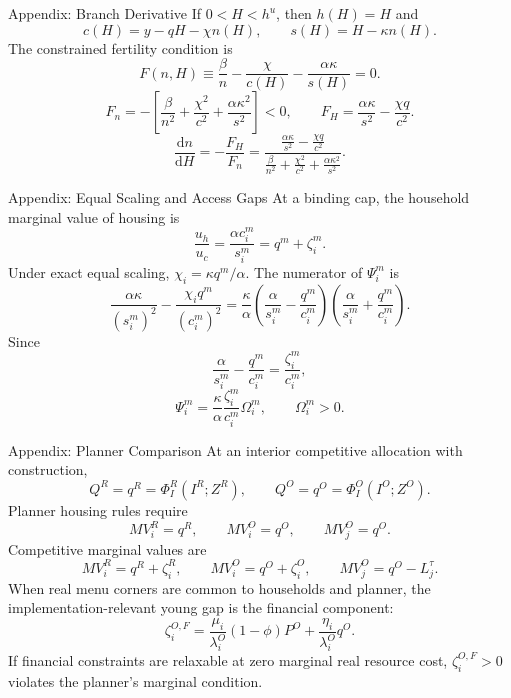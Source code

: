 \documentclass[11pt,aspectratio=169]{beamer}
\newcommand{\dd}{\mathrm d}
\newcommand{\1}{\mathbf 1}
\begin{document}
\appendix

\begin{frame}{Appendix: Branch Derivative}
\small
If \(0<H<h^u\), then \(h(H)=H\) and
\[
c(H)=y-qH-\chi n(H),
\qquad
s(H)=H-\kappa n(H).
\]
The constrained fertility condition is
\[
F(n,H)\equiv
\frac{\beta}{n}
-
\frac{\chi}{c(H)}
-
\frac{\alpha\kappa}{s(H)}
=0.
\]
\[
F_n
=
-
\left[
\frac{\beta}{n^2}
+
\frac{\chi^2}{c^2}
+
\frac{\alpha\kappa^2}{s^2}
\right]<0,
\qquad
F_H
=
\frac{\alpha\kappa}{s^2}
-
\frac{\chi q}{c^2}.
\]
\[
\frac{\dd n}{\dd H}
=
-\frac{F_H}{F_n}
=
\frac{
\frac{\alpha\kappa}{s^2}
-
\frac{\chi q}{c^2}
}{
\frac{\beta}{n^2}
+
\frac{\chi^2}{c^2}
+
\frac{\alpha\kappa^2}{s^2}
}.
\]
\end{frame}

\begin{frame}{Appendix: Equal Scaling and Access Gaps}
\small
At a binding cap, the household marginal value of housing is
\[
\frac{u_h}{u_c}
=
\frac{\alpha c_i^m}{s_i^m}
=q^m+\zeta_i^m.
\]
Under exact equal scaling, \(\chi_i=\kappa q^m/\alpha\). The numerator of \(\Psi_i^m\) is
\[
\frac{\alpha\kappa}{(s_i^m)^2}
-
\frac{\chi_i q^m}{(c_i^m)^2}
=
\frac{\kappa}{\alpha}
\left(
\frac{\alpha}{s_i^m}-\frac{q^m}{c_i^m}
\right)
\left(
\frac{\alpha}{s_i^m}+\frac{q^m}{c_i^m}
\right).
\]
Since
\[
\frac{\alpha}{s_i^m}-\frac{q^m}{c_i^m}
=
\frac{\zeta_i^m}{c_i^m},
\]
\[
\Psi_i^m
=
\frac{\kappa}{\alpha}
\frac{\zeta_i^m}{c_i^m}
\Omega_i^m,
\qquad
\Omega_i^m>0.
\]
\end{frame}

\begin{frame}{Appendix: Planner Comparison}
\small
At an interior competitive allocation with construction,
\[
Q^R=q^R=\Phi_I^R(I^R;Z^R),
\qquad
Q^O=q^O=\Phi_I^O(I^O;Z^O).
\]
Planner housing rules require
\[
MV_i^R=q^R,
\qquad
MV_i^O=q^O,
\qquad
MV_j^O=q^O.
\]
Competitive marginal values are
\[
MV_i^R=q^R+\zeta_i^R,
\qquad
MV_i^O=q^O+\zeta_i^O,
\qquad
MV_j^O=q^O-L_j^\tau.
\]
\medskip
When real menu corners are common to households and planner, the implementation-relevant young gap is the financial component:
\[
\zeta_i^{O,F}
=
\frac{\mu_i}{\lambda_i^O}(1-\phi)P^O
+
\frac{\eta_i}{\lambda_i^O}q^O.
\]
If financial constraints are relaxable at zero marginal real resource cost, \(\zeta_i^{O,F}>0\) violates the planner's marginal condition.
\end{frame}
\end{document}
